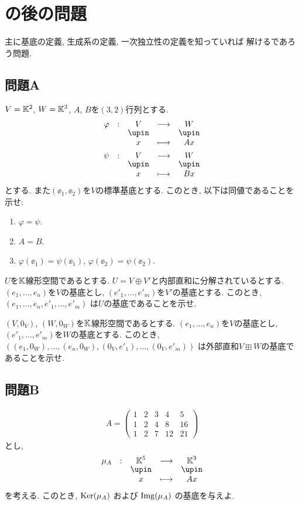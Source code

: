 \section{の後の問題}
主に基底の定義, 生成系の定義, 一次独立性の定義を知っていれば
解けるであろう問題.
\subsection{問題A}
\begin{quiz}
  $V=\mathbb{K}^2$, $W=\mathbb{K}^3$, $A$, $B$を$(3,2)$行列とする.
  \begin{align*}
    \shazo{\varphi}{V}{W}
    {x}{Ax} \\
    \shazo{\psi}{V}{W}
    {x}{Bx}
 \end{align*}
  とする.
  また$(\ee_1,\ee_2)$を$V$の標準基底とする.
  このとき, 以下は同値であることを示せ:
  \begin{enumerate}
  \item $\varphi=\psi$.
  \item $A=B$.
  \item $\varphi(\ee_1)=\psi(\ee_1)$, $\varphi(\ee_2)=\psi(\ee_2)$.
  \end{enumerate}
\end{quiz}

\begin{quiz}
  $U$を$\mathbb{K}$線形空間であるとする.
  $U=V\oplus V'$と内部直和に分解されているとする.
  $(e_1,\ldots,e_n)$を$V$の基底とし,
  $(e'_1,\ldots,e'_m)$を$V'$の基底とする.
  このとき,
  $(e_1,\ldots,e_n,e'_1,\ldots,e'_m)$
  は$U$の基底であることを示せ.  
\end{quiz}
\begin{quiz}
  $(V,0_V)$, $(W,0_W)$を$\mathbb{K}$線形空間であるとする.
  $(e_1,\ldots,e_n)$を$V$の基底とし,
  $(e'_1,\ldots,e'_m)$を$W$の基底とする.
  このとき,
  $((e_1,0_W),\ldots,(e_n,0_W),(0_V,e'_1),\ldots,(0_V,e'_m))$
  は外部直和$V\boxplus W$の基底であることを示せ.  
\end{quiz}

\subsection{問題B}
\begin{quiz}
  \begin{align*}
    A=
    \begin{pmatrix}
      1&2&3&4&5\\
      1&2&4&8&16\\
      1&2&7&12&21
    \end{pmatrix}
  \end{align*}
  とし,
  \begin{align*}
    \shazo{\mu_A}{\KK^5}{\KK^3}
    {x}{Ax}
  \end{align*}
  を考える.
  このとき,
  $\operatorname{Ker}(\mu_A)$
  および
  $\operatorname{Img}(\mu_A)$
  の基底を与えよ.
\end{quiz}

